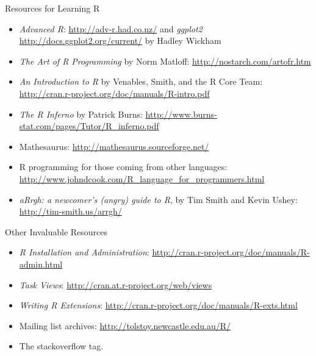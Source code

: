 \begin{frame}
  \begin{block}{Resources for Learning R}\pause
  \begin{itemize}[<+-|alert@+>]
    \item \emph{Advanced R}: \url{http://adv-r.had.co.nz/} and
      \emph{ggplot2} \url{http://docs.ggplot2.org/current/} by Hadley Wickham
    \item \emph{The Art of R Programming} by Norm Matloff:
\url{http://nostarch.com/artofr.htm}\\[.2cm]

    \item \emph{An Introduction to R} by Venables, Smith, and the R Core Team:
\url{http://cran.r-project.org/doc/manuals/R-intro.pdf}\\[.2cm]

    \item \emph{The R Inferno} by Patrick Burns:
\url{http://www.burns-stat.com/pages/Tutor/R_inferno.pdf}\\[.2cm]

    \item Mathesaurus:  \url{http://mathesaurus.sourceforge.net/}\\[.2cm]

    \item R programming for those coming from other languages:
\url{http://www.johndcook.com/R_language_for_programmers.html}\\[.2cm]

    \item \emph{aRrgh: a newcomer's (angry) guide to R}, by Tim Smith and Kevin
Ushey:
    \url{http://tim-smith.us/arrgh/}
  \end{itemize}
\end{block}
\end{frame}


\begin{frame}
  \begin{block}{Other Invaluable Resources}\pause
    \begin{itemize}[<+-|alert@+>]
    \item \emph{R Installation and Administration}:
      \url{http://cran.r-project.org/doc/manuals/R-admin.html}
    \item \emph{Task Views}:
      \url{http://cran.at.r-project.org/web/views}
    \item \emph{Writing R Extensions}:
      \url{http://cran.r-project.org/doc/manuals/R-exts.html}
    \item Mailing list archives: \url{http://tolstoy.newcastle.edu.au/R/}
    \item The \code{[R]} stackoverflow tag.
    \end{itemize}
  \end{block}
\end{frame}